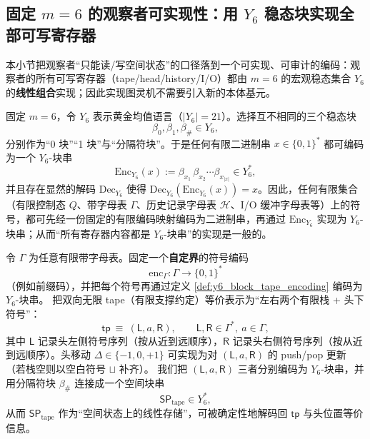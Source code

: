 \subsection{固定 \texorpdfstring{$m=6$}{m=6} 的观察者可实现性：用 \texorpdfstring{$Y_6$}{Y6} 稳态块实现全部可写寄存器}\label{subsec:observer_tm_realizability_m6}
本小节把观察者“只能读/写空间状态”的口径落到一个可实现、可审计的编码：观察者的所有可写寄存器（tape/head/history/I/O）都由 \(m=6\) 的宏观稳态集合 \(Y_6\) 的\textbf{线性组合}实现；因此实现图灵机不需要引入新的本体基元。

\begin{definition}[\(Y_6\) 稳态块带与二进制编码]\label{def:y6_block_tape_encoding}
固定 \(m=6\)，令 \(Y_6\) 表示黄金均值语言（\(|Y_6|=21\)）。选择互不相同的三个稳态块
$$
\beta_0,\beta_1,\beta_\#\in Y_6,
$$
分别作为“0 块”“1 块”与“分隔符块”。于是任何有限二进制串 \(x\in\{0,1\}^\ast\) 都可编码为一个 \(Y_6\)-块串
$$
\mathrm{Enc}_{Y_6}(x):=\beta_{x_1}\,\beta_{x_2}\cdots \beta_{x_{|x|}}\in Y_6^\ast,
$$
并且存在显然的解码 \(\mathrm{Dec}_{Y_6}\) 使得 \(\mathrm{Dec}_{Y_6}(\mathrm{Enc}_{Y_6}(x))=x\)。因此，任何有限集合（有限控制态 \(Q\)、带字母表 \(\Gamma\)、历史记录字母表 \(\mathcal H\)、I/O 缓冲字母表等）上的符号，都可先经一份固定的有限编码映射编码为二进制串，再通过 \(\mathrm{Enc}_{Y_6}\) 实现为 \(Y_6\)-块串；从而“所有寄存器内容都是 \(Y_6\)-块串”的实现是一般的。
\end{definition}

\begin{definition}\label{def:y6_tm_tape_via_two_stacks}
令 \(\Gamma\) 为任意有限带字母表。固定一个\textbf{自定界}的符号编码
$$
\mathrm{enc}_\Gamma:\Gamma\to \{0,1\}^\ast
$$
（例如前缀码），并把每个符号再通过定义 \ref{def:y6_block_tape_encoding} 编码为 \(Y_6\)-块串。
把双向无限 tape（有限支撑约定）等价表示为“左右两个有限栈 + 头下符号”：
$$
\mathsf{tp}\ \equiv\ (\mathsf{L},a,\mathsf{R}),\qquad \mathsf{L},\mathsf{R}\in\Gamma^\ast,\ a\in\Gamma,
$$
其中 \(\mathsf{L}\) 记录头左侧符号序列（按从近到远顺序），\(\mathsf{R}\) 记录头右侧符号序列（按从近到远顺序）。头移动 \(\Delta\in\{-1,0,+1\}\) 可实现为对 \((\mathsf{L},a,\mathsf{R})\) 的 push/pop 更新（若栈空则以空白符号 \(\sqcup\) 补齐）。
我们把 \((\mathsf{L},a,\mathsf{R})\) 三者分别编码为 \(Y_6\)-块串，并用分隔符块 \(\beta_\#\) 连接成一个空间块串
$$
\mathsf{SP}_{\mathrm{tape}}\in Y_6^\ast,
$$
从而 \(\mathsf{SP}_{\mathrm{tape}}\) 作为“空间状态上的线性存储”，可被确定性地解码回 \(\mathsf{tp}\) 与头位置等价信息。
\end{definition}

